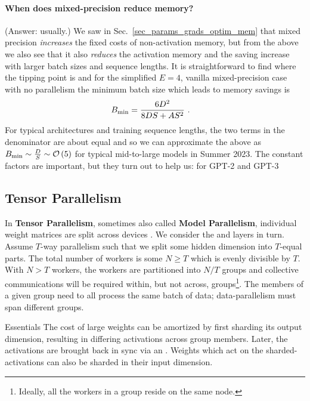 \documentclass[11pt]{article}
\begin{document}
\paragraph{When does mixed-precision reduce memory?} (Answer: usually.) We saw in Sec.~\ref{sec_params_grads_optim_mem}
that mixed precision \textit{increases} the fixed costs of non-activation memory, but from the above
we also see that it also \textit{reduces} the activation memory and the saving increase with larger
batch sizes and sequence lengths. It is straightforward to find where the tipping point is and for
the simplified $ E=4$, vanilla mixed-precision case with no parallelism the minimum batch size which
leads to memory savings is
\begin{align}
  B _{ {\rm min}  } &= \frac{ 6 D ^{ 2 } }{ 8 DS + A S ^{ 2 } }\label{eq_min_mp_batch_size}\ .
\end{align}
For typical architectures and training sequence lengths, the two terms in the denominator are about
equal and so we can approximate the above as $ B _{ {\rm min}  } \sim \frac{ D }{ S }  \sim \mathcal{O}
\left( 5 \right) $ for typical mid-to-large models in Summer 2023. The constant factors are
important, but they turn out to help us: for GPT-2 and GPT-3

\subsection{Tensor Parallelism \label{subsec_tensor_parallelism} }


In \textbf{Tensor Parallelism}, sometimes also called \textbf{Model Parallelism}, individual weight
matrices are split across devices \cite{shoeybi2020megatronlm}. We consider the  and
 layers in turn. Assume $ T $-way parallelism such that we split some
hidden dimension into $ T $-equal parts. The total number of workers is some $ N \ge T $ which is
evenly divisible by $ T $. With $ N >T $ workers, the workers are partitioned into $ N/T $ groups
and collective communications will be required within, but not across, groups\footnote{Ideally, all
the workers in a group reside on the same node.}. The members of a given group need to all process
the same batch of data; data-parallelism must span different groups.


\begin{nicebox}{Essentials}
The cost of large weights can be amortized by first sharding its output dimension, resulting in
differing activations across group members. Later, the activations are brought back in sync via
an . Weights which act on the sharded-activations can also be sharded in their
input dimension.
\end{nicebox}
\end{document}
